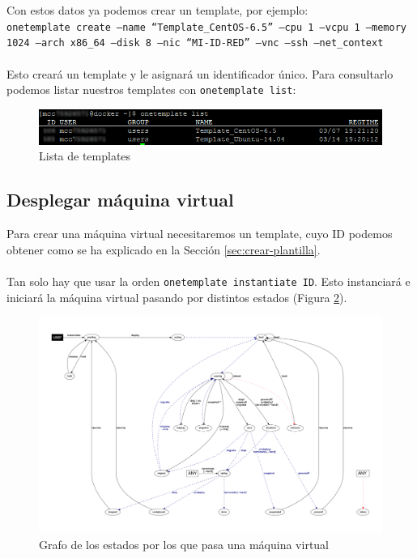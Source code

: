 Con estos datos ya podemos crear un template, por ejemplo:
\\
\texttt{onetemplate create --name ``Template\_CentOS-6.5'' --cpu 1 --vcpu 1 --memory 1024 --arch x86\_64 --disk 8 --nic ``MI-ID-RED'' --vnc --ssh --net\_context}
\\ \\
Esto creará un template y le asignará un identificador único. Para consultarlo podemos listar nuestros templates con \texttt{onetemplate list}:

\begin{figure}[H]
	\centering
	\includegraphics[width=14cm]{img/onetemplate-list}
	\caption{Lista de templates}
	\label{fig:onetemplate-list}
\end{figure}

\subsection{Desplegar máquina virtual}

Para crear una máquina virtual necesitaremos un template, cuyo ID podemos obtener como se ha explicado en la Sección \ref{sec:crear-plantilla}.
\\ \\
Tan solo hay que usar la orden \texttt{onetemplate instantiate ID}. Esto instanciará e iniciará la máquina virtual pasando por distintos estados (Figura \ref{fig:grafo-estados}).

\begin{figure}[H]
	\centering
	\includegraphics[width=14.5cm]{img/grafo-estados}
	\caption{Grafo de los estados por los que pasa una máquina virtual}
	\label{fig:grafo-estados}
\end{figure}

